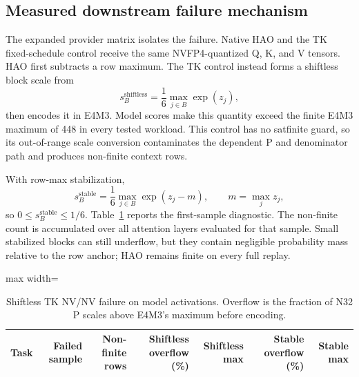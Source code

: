 \subsection{Measured downstream failure mechanism}
\label{app:nvnv-failure}

The expanded provider matrix isolates the failure. Native HAO and the TK
fixed-schedule control receive the same NVFP4-quantized Q, K, and V tensors.
HAO first subtracts a row maximum. The TK control instead forms a shiftless
block scale from
\begin{equation}
  s_B^{\mathrm{shiftless}}
  = \frac{1}{6}\max_{j\in B}\exp(z_j),
\end{equation}
then encodes it in E4M3. Model scores make this quantity exceed the finite
E4M3 maximum of 448 in every tested workload. This control has no
satfinite guard, so its out-of-range scale conversion contaminates the
dependent P and denominator path and produces non-finite context rows.

With row-max stabilization,
\begin{equation}
  s_B^{\mathrm{stable}}
  = \frac{1}{6}\max_{j\in B}\exp(z_j-m),
  \qquad m=\max_j z_j,
\end{equation}
so $0\le s_B^{\mathrm{stable}}\le 1/6$. Table~\ref{tab:nvnv-failure}
reports the first-sample diagnostic. The non-finite count is accumulated
over all attention layers evaluated for that sample. Small stabilized blocks
can still underflow, but they contain negligible probability mass relative
to the row anchor; HAO remains finite on every full replay.

\begin{table}[htbp]
\centering
\caption{Shiftless TK NV/NV failure on model activations. Overflow is the
fraction of N32 P scales above E4M3's maximum before encoding.}
\label{tab:nvnv-failure}
\scriptsize
\begin{adjustbox}{max width=\textwidth}
\begin{tabular}{lrrrrrr}
\toprule
Task & Failed sample & Non-finite rows & Shiftless overflow (\%)
& Shiftless max & Stable overflow (\%) & Stable max \\
\midrule
%
\end{tabular}
\end{adjustbox}
\end{table}
